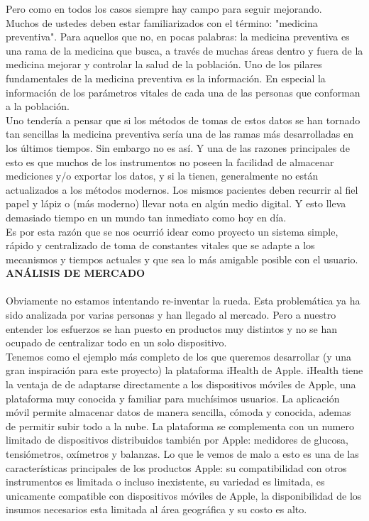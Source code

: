 \documentclass[11pt]{report}
\begin{document}
Pero como en todos los casos siempre hay campo para seguir mejorando.\\

Muchos de ustedes deben estar familiarizados con el término: "medicina preventiva". Para aquellos que no, en pocas palabras: la medicina preventiva es una rama de la medicina que busca, a través de muchas áreas dentro y fuera de la medicina mejorar y controlar la salud de la población. Uno de los pilares fundamentales de la medicina preventiva es la información. En especial la información de los parámetros vitales de cada una de las personas que conforman a la población.\\

Uno tendería a pensar que si los métodos de tomas de estos datos se han tornado tan sencillas la medicina preventiva sería una de las ramas más desarrolladas en los últimos tiempos. Sin embargo no es así. Y una de las razones principales de esto es que muchos de los instrumentos no poseen la facilidad de almacenar mediciones y/o exportar
los datos, y si la tienen, generalmente  no están actualizados a los métodos modernos.
Los mismos pacientes deben recurrir al fiel papel y lápiz o (más moderno) llevar nota en algún medio digital. Y esto lleva demasiado tiempo en un mundo tan inmediato como hoy en día.\\

Es por esta razón que se nos ocurrió idear como proyecto un sistema simple, rápido y centralizado de toma de constantes vitales que se adapte a los mecanismos y tiempos actuales y que sea lo más amigable posible con el usuario.\\


\newpage
\noindent \Large \textbf{ANÁLISIS DE MERCADO} \\
\\

Obviamente no estamos intentando re-inventar la rueda. Esta problemática ya ha sido analizada por varias personas y han llegado al mercado. Pero a nuestro entender los esfuerzos se han puesto en productos muy distintos y no se han ocupado de centralizar todo en un solo dispositivo.\\

Tenemos como el ejemplo más completo de los que queremos desarrollar (y una gran inspiración para este proyecto) la plataforma iHealth de Apple. iHealth tiene la ventaja de de adaptarse directamente a los dispositivos móviles de Apple, una plataforma muy conocida y familiar para muchísimos usuarios. La aplicación móvil permite almacenar datos de manera sencilla, cómoda y conocida, ademas de permitir subir todo a la nube. La plataforma se complementa con un numero limitado de dispositivos distribuidos también por Apple: medidores de glucosa, tensiómetros, oxímetros y
balanzas. Lo que le vemos de malo a esto es una de las características principales de los productos Apple: su compatibilidad con otros instrumentos es limitada o incluso inexistente, su variedad es limitada, es unicamente compatible con dispositivos móviles de Apple, la disponibilidad de los insumos necesarios esta limitada al área geográfica y su costo es alto.\\
\end{document}
